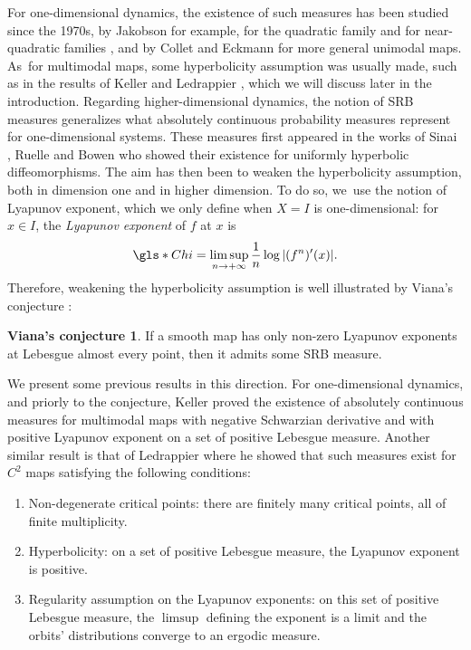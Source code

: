 \documentclass[JEP,XML,SOM,Unicode,NoFloatCountersInSection,published]{cedram}
\newenvironment{enumeratei}
{\bgroup\def\theenumi{\roman{enumi}}\def\theenumii{\arabic{enumii}}\begin{enumerate}}
{\end{enumerate}\egroup}
\let\rC C
\theoremstyle{definition}
\newtheorem*{conj*}{Viana's conjecture}
\begin{document}
For one-dimensional dynamics, the existence of such measures has been studied since the 1970s,
by Jakobson for example, for the quadratic family \cite{Jakobson1980} and for near-quadratic families \cite{Jakobson1981}, and by Collet and Eckmann \cite{ColletEckmann} for more general unimodal maps. As~for multimodal maps, some hyperbolicity assumption was usually made, such as in the results of Keller \cite{Keller_1990} and Ledrappier \cite{Ledrappier_1981}, which we will discuss later in the introduction.
Regarding higher-dimensional dynamics, the notion of SRB measures generalizes what absolutely continuous probability measures represent for one-dimensional systems. These measures first appeared in the works of Sinai \cite{Sinai_1972}, Ruelle \cite{Ruelle_1978,Ruelle_1976} and Bowen \cite{Bowen_1975} who showed their existence for uniformly hyperbolic diffeomorphisms.
The aim has then been to weaken the hyperbolicity assumption, both in dimension one and in higher dimension.
To do so, we~use the notion of Lyapunov exponent, which we only define when $X=I$ is one-dimensional: for $x \in I$, the \textit{Lyapunov exponent} of $f$ at $x$ is
\[
\gls*{Chi} = \limsup_{n \to +\infty} \frac{1}{n} \log |(f^n)'(x)|.
\]
Therefore, weakening the hyperbolicity assumption is well illustrated by Viana's conjecture \cite{Viana1998DynamicsAP}:

\begin{conj*}
If a smooth map has only non-zero Lyapunov exponents at Lebesgue almost every point, then it admits some SRB measure.
\end{conj*}

We present some previous results in this direction. For one-dimensional dynamics, and priorly to the conjecture, Keller \cite{Keller_1990} proved the existence of absolutely continuous measures for multimodal maps with negative Schwarzian derivative and with positive Lyapunov exponent on a set of positive Lebesgue measure.
Another similar result is that of Ledrappier \cite{Ledrappier_1981} where he showed that such measures exist for $\rC^2$ maps satisfying the following conditions:
\begin{enumeratei}
\item
Non-degenerate critical points: there are finitely many critical points, all of finite multiplicity.
\item
Hyperbolicity: on a set of positive Lebesgue measure, the Lyapunov exponent is positive.
\item
Regularity assumption on the Lyapunov exponents: on this set of positive Lebesgue measure, the $\limsup$ defining the exponent is a limit and the orbits' distributions converge to an ergodic measure.
\end{enumeratei}
\end{document}
